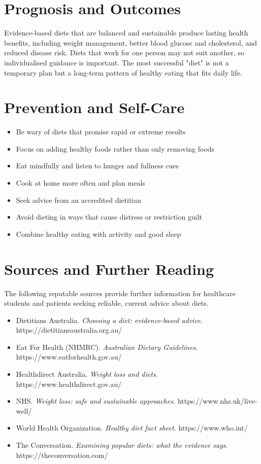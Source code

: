 \section*{Prognosis and Outcomes}
Evidence-based diets that are balanced and sustainable produce lasting health benefits, including weight management, better blood glucose and cholesterol, and reduced disease risk. Diets that work for one person may not suit another, so individualised guidance is important. The most successful "diet" is not a temporary plan but a long-term pattern of healthy eating that fits daily life.

\section*{Prevention and Self-Care}
\begin{itemize}
    \item Be wary of diets that promise rapid or extreme results
    \item Focus on adding healthy foods rather than only removing foods
    \item Eat mindfully and listen to hunger and fullness cues
    \item Cook at home more often and plan meals
    \item Seek advice from an accredited dietitian
    \item Avoid dieting in ways that cause distress or restriction guilt
    \item Combine healthy eating with activity and good sleep
\end{itemize}

\section*{Sources and Further Reading}
The following reputable sources provide further information for healthcare students and patients seeking reliable, current advice about diets.

\begin{itemize}
    \item Dietitians Australia. \textit{Choosing a diet: evidence-based advice.} https://dietitiansaustralia.org.au/
    \item Eat For Health (NHMRC). \textit{Australian Dietary Guidelines.} https://www.eatforhealth.gov.au/
    \item Healthdirect Australia. \textit{Weight loss and diets.} https://www.healthdirect.gov.au/
    \item NHS. \textit{Weight loss: safe and sustainable approaches.} https://www.nhs.uk/live-well/
    \item World Health Organization. \textit{Healthy diet fact sheet.} https://www.who.int/
    \item The Conversation. \textit{Examining popular diets: what the evidence says.} https://theconversation.com/
\end{itemize}
